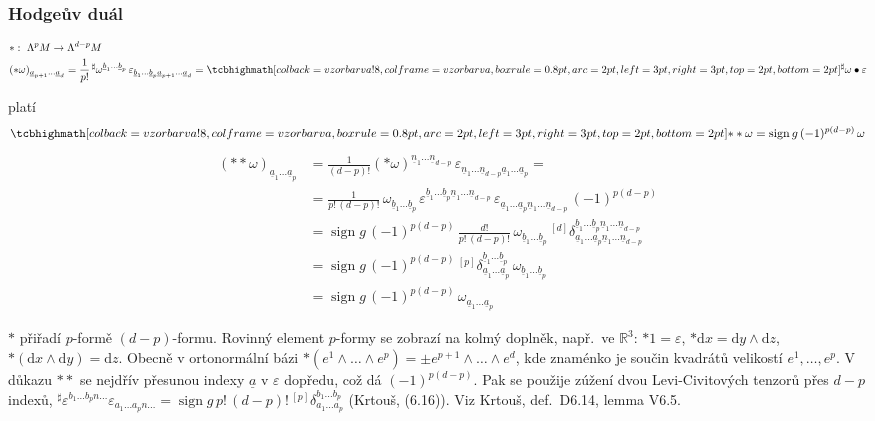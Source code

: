 \subsubsection*{Hodgeův duál} 
\begin{definice}
\begin{align*}
  &*:\ \Lambda^pM \to \Lambda^{d-p}M \\
  &(*\omega)_{\underline{a}_{p+1}\dots\underline{a}_d} = \frac{1}{p!}\,{}^\sharp\omega^{\underline{b}_1\dots\underline{b}_p}\,\varepsilon_{\underline{b}_1\dots\underline{b}_p\underline{a}_{p+1}\dots\underline{a}_d}
   = \vzorec{{}^\sharp\omega\bullet\varepsilon}
\end{align*}
\end{definice}

platí
\[
  \vzorec{**\omega = \operatorname{sign}g\,(-1)^{p(d-p)}\,\omega}
\]
\begin{align*}
  (**\omega)_{\underline{a}_1\dots\underline{a}_p}
  &= \frac{1}{(d-p)!}(*\omega)^{\underline{n}_1\dots\underline{n}_{d-p}}\,\varepsilon_{\underline{n}_1\dots\underline{n}_{d-p}\underline{a}_1\dots\underline{a}_p} = \\
  &= \frac{1}{p!\,(d-p)!}\,\omega_{\underline{b}_1\dots\underline{b}_p}\,\varepsilon^{\underline{b}_1\dots\underline{b}_p\underline{n}_1\dots\underline{n}_{d-p}}\,\varepsilon_{\underline{a}_1\dots\underline{a}_p\underline{n}_1\dots\underline{n}_{d-p}}\,(-1)^{p(d-p)} \\
  &= \operatorname{sign}g\,(-1)^{p(d-p)}\,\frac{d!}{p!\,(d-p)!}\,\omega_{\underline{b}_1\dots\underline{b}_p}\,{}^{[d]}\delta^{\underline{b}_1\dots\underline{b}_p\underline{n}_1\dots\underline{n}_{d-p}}_{\underline{a}_1\dots\underline{a}_p\underline{n}_1\dots\underline{n}_{d-p}} \\
  &= \operatorname{sign}g\,(-1)^{p(d-p)}\,{}^{[p]}\delta^{\underline{b}_1\dots\underline{b}_p}_{\underline{a}_1\dots\underline{a}_p}\,\omega_{\underline{b}_1\dots\underline{b}_p} \\
  &= \operatorname{sign}g\,(-1)^{p(d-p)}\,\omega_{\underline{a}_1\dots\underline{a}_p}
\end{align*}

\begin{vysvetleni}
$*$ přiřadí $p$-formě  $(d-p)$-formu. Rovinný element $p$-formy se zobrazí na kolmý doplněk, např.\ ve $\mathbb{R}^3$: $*1=\varepsilon$, $*\mathrm{d}x=\mathrm{d}y\wedge\mathrm{d}z$, $*(\mathrm{d}x\wedge\mathrm{d}y)=\mathrm{d}z$. Obecně v ortonormální bázi $*(e^1\wedge\dots\wedge e^p)=\pm e^{p+1}\wedge\dots\wedge e^d$, kde znaménko je součin kvadrátů velikostí $e^1,\dots,e^p$.
V důkazu $**$ se nejdřív přesunou indexy $\underline{a}$ v $\varepsilon$ dopředu, což dá $(-1)^{p(d-p)}$. Pak se použije zúžení dvou Levi-Civitových tenzorů přes $d-p$ indexů, ${}^\sharp\varepsilon^{b_1\dots b_p n\dots}\varepsilon_{a_1\dots a_p n\dots}=\operatorname{sign}g\,p!\,(d-p)!\,{}^{[p]}\delta^{b_1\dots b_p}_{a_1\dots a_p}$ (Krtouš, (6.16)).
Viz Krtouš, def.~D6.14, lemma V6.5.
\end{vysvetleni}

